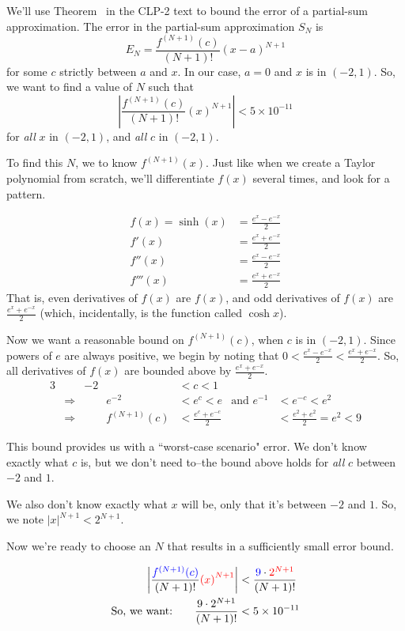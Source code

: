 \begin{solution}
	We'll use  Theorem~ in the CLP-2 text to bound the error of a partial-sum approximation. The error in the partial-sum approximation $S_N$ is
	\[E_N=\frac{f^{(N+1)}(c)}{(N+1)!}(x-a)^{N+1}\]
	for some $c$ strictly between $a$ and $x$. In our case, $a=0$ and $x$ is in $(-2,1)$. So, we want to find a value of $N$ such that
	\[\left|\frac{f^{(N+1)}(c)}{(N+1)!}\left(x\right)^{N+1}\right|<5\times 10^{-11}\]
	for \emph{all} $x$ in $(-2,1)$, and \emph{all} $c$ in $(-2,1)$.

	To find this $N$, we to know $f^{(N+1)}(x)$. Just like when we create a Taylor polynomial from scratch, we'll differentiate $f(x)$ several times, and look for a pattern.

\begin{align*}
f(x)=\sinh(x)&=\frac{e^x-e^{-x}}{2}\\
f'(x)&=\frac{e^x+e^{-x}}{2}\\
f''(x)&=\frac{e^x-e^{-x}}{2}\\
f'''(x)&=\frac{e^x+e^{-x}}{2}
\end{align*}
That is, even derivatives of $f(x)$ are $f(x)$, and odd derivatives of $f(x)$ are $\frac{{e^x}+e^{-x}}{2}$ (which, incidentally, is the function called $\cosh x$).

	Now we want a reasonable bound on $f^{(N+1)}(c)$, when $c$ is in $(-2,1)$. Since powers of $e$ are always positive, we begin by noting that $0<\frac{e^x-e^{-x}}{2}<\frac{e^x+e^{-x}}{2}$. So, all derivatives of $f(x)$ are bounded above by $\frac{e^x+e^{-x}}{2}$.
	\begin{alignat*}{3}
	&&-2 &<c<1\\
	&\Rightarrow&\qquad e^{-2} &<e^c<e &\mbox{and } e^{-1}&<e^{-c}<e^2\\
	&\Rightarrow&\qquad f^{(N+1)}(c)&<\frac{e^c+e^{-c}}{2} & &<\frac{e^2+e^2}{2}=e^2<9
	\end{alignat*}

	This bound provides us with a ``worst-case scenario" error. We don't know exactly what $c$ is, but we don't need to--the bound above holds for \emph{all} $c$ between $-2$ and $1$.

	We also don't know exactly what $x$ will be, only that it's between $-2$ and $1$. So, we note $|x|^{N+1}<2^{N+1}$.

	Now we're ready to choose an $N$ that results in a sufficiently small error bound.

	\begin{align*}
	\left|\frac{\textcolor{blue}{f^{(N+1)}(c)}}{(N+1)!}\textcolor{red}{\left(x\right)^{N+1}}\right|&<
	\frac{\textcolor{blue}{9}\cdot \textcolor{red}{2^{N+1}}}{(N+1)!}\\
	\text{So, we want:}\qquad \frac{9\cdot2^{N+1}}{(N+1)!}&<5\times 10^{-11}
	\end{align*}


\end{solution}

